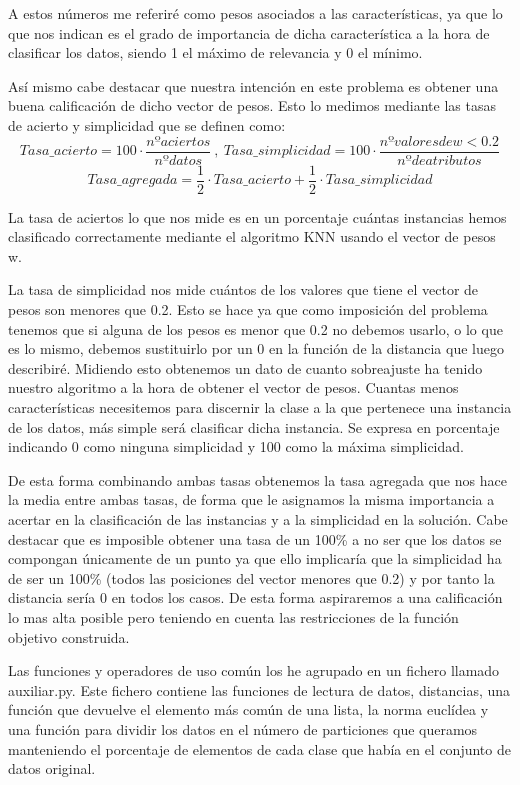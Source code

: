 \documentclass[12pt,a4paper]{article}
\begin{document}
	A estos números me referiré como pesos asociados a las características, ya que lo que nos indican es el grado de importancia de dicha característica a la hora de clasificar los datos, siendo 1 el máximo de relevancia y 0 el mínimo.

	Así mismo cabe destacar que nuestra intención en este problema es obtener una buena calificación de dicho vector de pesos. Esto lo medimos mediante las tasas de acierto y simplicidad que se definen como:
	$$Tasa\_acierto = 100\cdot \frac{nº aciertos}{nº datos} \ , \ Tasa\_simplicidad = 100\cdot \frac{nº valores de w < 0.2}{nº de atributos}$$
	$$Tasa\_agregada = \frac{1}{2}\cdot Tasa\_acierto + \frac{1}{2}\cdot Tasa\_simplicidad$$

	La tasa de aciertos lo que nos mide es en un porcentaje cuántas instancias hemos clasificado correctamente mediante el algoritmo KNN usando el vector de pesos w.

	La tasa de simplicidad nos mide cuántos de los valores que tiene el vector de pesos son menores que 0.2. Esto se hace ya que como imposición del problema tenemos que si alguna de los pesos es menor que 0.2 no debemos usarlo, o lo que es lo mismo, debemos sustituirlo por un 0 en la función de la distancia que luego describiré. Midiendo esto obtenemos un dato de cuanto sobreajuste ha tenido nuestro algoritmo a la hora de obtener el vector de pesos. Cuantas menos características necesitemos para discernir la clase a la que pertenece una instancia de los datos, más simple será clasificar dicha instancia. Se expresa en porcentaje indicando 0 como ninguna simplicidad y 100 como la máxima simplicidad.

	De esta forma combinando ambas tasas obtenemos la tasa agregada que nos hace la media entre ambas tasas, de forma que le asignamos la misma importancia a acertar en la clasificación de las instancias y a la simplicidad en la solución. Cabe destacar que es imposible obtener una tasa de un 100\% a no ser que los datos se compongan únicamente de un punto ya que ello implicaría que la simplicidad ha de ser un 100\% (todos las posiciones del vector menores que 0.2) y por tanto la distancia sería 0 en todos los casos. De esta forma aspiraremos a una calificación lo mas alta posible pero teniendo en cuenta las restricciones de la función objetivo construida.

	Las funciones y operadores de uso común los he agrupado en un fichero llamado auxiliar.py. Este fichero contiene las funciones de lectura de datos, distancias, una función que devuelve el elemento más común de una lista, la norma euclídea y una función para dividir los datos en el número de particiones que queramos manteniendo el porcentaje de elementos de cada clase que había en el conjunto de datos original.
\end{document}
